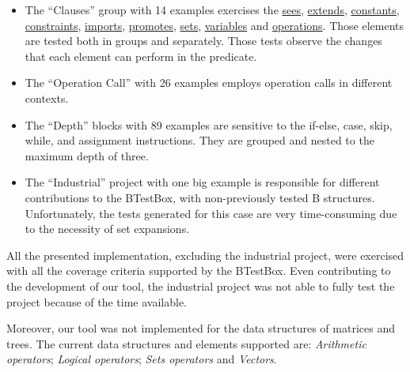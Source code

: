 \documentclass[runningheads]{llncs}
\begin{document}
\begin{itemize}
    \item The ``Clauses'' group with 14 examples exercises the \underline{sees}, \underline{extends}, \underline{constants}, \underline{constraints}, \underline{imports}, \underline{promotes}, \underline{sets}, \underline{variables} and \underline{operations}. Those elements are tested both in groups and separately. Those tests observe the changes that each element can perform in the predicate.
    \item The ``Operation Call'' with 26 examples employs operation calls in different contexts.
    \item The ``Depth'' blocks with 89 examples are sensitive to the if-else, case, skip, while, and assignment instructions. They are grouped and nested to the maximum depth of three.
    \item The ``Industrial'' project with one big example is responsible for different contributions to the BTestBox, with non-previously tested B structures. Unfortunately, the tests generated for this case are very time-consuming due to the necessity of set expansions.
\end{itemize}

All the presented implementation, excluding the industrial project, were exercised with all the coverage criteria supported by the BTestBox. Even contributing to the development of our tool, the industrial project was not able to fully test the project because of the time available.

Moreover, our tool was not implemented for the data structures of matrices and trees. 
The current data structures and elements supported are: \textit{Arithmetic operators}; \textit{Logical operators};  \textit{Sets operators} and \textit{Vectors}.
\end{document}
